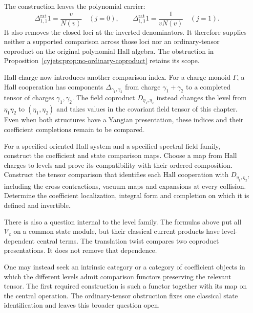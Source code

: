 The construction leaves the polynomial carrier:
\[
 \Delta^{\mathrm{rat}}_{1,1}1=\frac{v}{N(v)}
       \quad(j=0),\qquad
 \Delta^{\mathrm{rat}}_{1,1}1=\frac1{vN(v)}
       \quad(j=1).
\]
It also removes the closed loci at the inverted denominators.
It therefore supplies neither a supported comparison across those
loci nor an ordinary-tensor coproduct on the original polynomial
Hall algebra. The obstruction in
Proposition~\ref{cyjets:prop:no-ordinary-coproduct} retains its scope.

Hall charge now introduces another comparison index.
For a charge monoid $\Gamma$, a Hall cooperation has components
$\Delta_{\gamma_1,\gamma_2}$ from charge
$\gamma_1+\gamma_2$ to a completed tensor of charges
$\gamma_1,\gamma_2$.
The field coproduct $D_{\eta_1,\eta_2}$ instead changes the level
from $\eta_1\eta_2$ to $(\eta_1,\eta_2)$ and takes values in the
covariant field tensor of this chapter.
Even when both structures have a Yangian presentation, these
indices and their coefficient completions remain to be compared.

\begin{problem}\label{cylev:prob:hall-level}
For a specified oriented Hall system and a specified spectral field
family, construct the coefficient and state comparison maps.
Choose a map from Hall charges to levels and prove its compatibility
with their ordered composition.
Construct the tensor comparison that identifies each Hall
cooperation with $D_{\eta_1,\eta_2}$, including the cross contractions,
vacuum maps and expansions at every collision.
Determine the coefficient localization, integral form and completion
on which it is defined and invertible.
\end{problem}

There is also a question internal to the level family.
The formulas above put all $\mathcal V_c$ on a common state module,
but their classical current products have level-dependent central
terms. The translation twist compares two coproduct presentations.
It does not remove that dependence.

One may instead seek an intrinsic category or a category of
coefficient objects in which the different levels admit comparison
functors preserving the relevant tensor.
The first required construction is such a functor together with its
map on the central operation. The ordinary-tensor obstruction fixes
one classical state identification and leaves this broader question
open.
